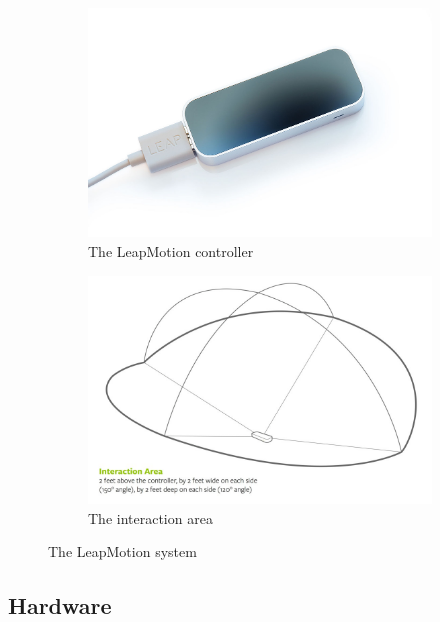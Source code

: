 \documentclass[12pt,a4paper,twoside]{report}
\begin{document}
\begin{figure}[h]
  \centering
  \begin{subfigure}{0.45\textwidth}
    \includegraphics[width=\linewidth]{img/Leap_motion.jpg}
    \caption{The LeapMotion controller}
    \label{fig:leap_controller}
  \end{subfigure}
  \begin{subfigure}{0.45\textwidth}
    \includegraphics[width=\linewidth]{img/Leap_interaction.png}
    \caption{The interaction area}
    \label{fig:leap_interaction}
  \end{subfigure}
  \caption{The LeapMotion system}
\end{figure}

\subsection{Hardware}
\end{document}
